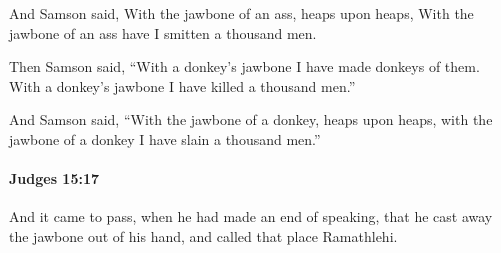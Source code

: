 			\begin{versebox}
					\item[BHS] 
					\item[ASV] And Samson said, With the jawbone of an ass, heaps upon heaps, With the jawbone of an ass have I smitten a thousand men.
					\item[NIV] Then Samson said, “With a donkey’s jawbone I have made donkeys of them. With a donkey’s jawbone I have killed a thousand men.”
					\item[NRSV] And Samson said, “With the jawbone of a donkey, heaps upon heaps, with the jawbone of a donkey I have slain a thousand men.”
			\end{versebox}

		\paragraph{Judges 15:17} %
			\label{JUDGES-15-17}

			And it came to pass, when he had made an end of speaking, that he cast away the jawbone out of his hand, and called that place Ramathlehi.

